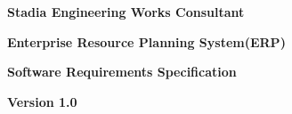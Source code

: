 \begin{titlepage}
\begin{center}
		\begin{LARGE}
			\bf{Stadia Engineering Works Consultant}
		\end{LARGE}
		\vspace*{30pt}
		
		{\large \textbf{Enterprise Resource Planning System(ERP)}}
		\vspace{1.5\baselineskip}
		
		{\large \textbf{Software Requirements Specification}}
		\vspace{1.5\baselineskip}	
		
		{\large \textbf{Version 1.0}}
		\vspace{3.5\baselineskip}
		
		
		\vspace{15pt}
	
	\end{center}
\end{titlepage}